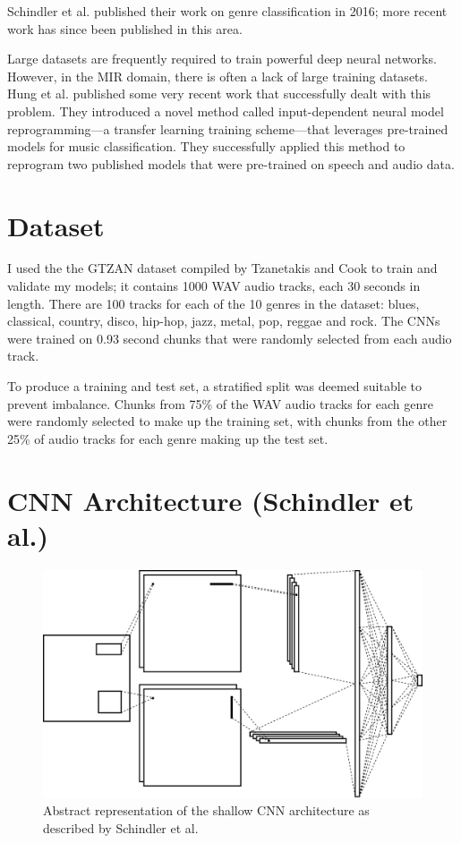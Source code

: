\documentclass[conference]{IEEEtran}
\begin{document}
Schindler et al. published their work on genre classification in 2016; more recent work has since been published in this area.

Large datasets are frequently required to train powerful deep neural networks.
However, in the MIR domain, there is often  a lack of large training datasets.
Hung et al. \cite{HungYangChenLerch} published some very recent work that successfully dealt with this problem.
They introduced a novel method called input-dependent neural model reprogramming---a transfer learning training scheme---that leverages pre-trained models for music classification.
They successfully applied this method to reprogram two published models that were pre-trained on speech and audio data.

\section{Dataset}

I used the the GTZAN dataset compiled by Tzanetakis and Cook \cite{TzanetakisCook} to train and validate my models; it contains 1000 WAV audio tracks, each 30 seconds in length.
There are 100 tracks for each of the 10 genres in the dataset: blues, classical, country, disco, hip-hop, jazz, metal, pop, reggae and rock.
The CNNs were trained on 0.93 second chunks that were randomly selected from each audio track.

To produce a training and test set, a stratified split was deemed suitable to prevent imbalance.
Chunks from 75\% of the WAV audio tracks for each genre were randomly selected to make up the training set, with chunks from the other 25\% of audio tracks for each genre making up the test set.

\section{CNN Architecture (Schindler et al.)}

\begin{figure}[htbp]
    \centerline{\includegraphics[width=\columnwidth]{architecture.jpg}}
    \caption{Abstract representation of the shallow CNN architecture as described by Schindler et al.}
    \label{architecture}
\end{figure}
\end{document}

